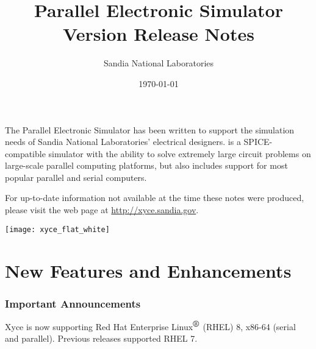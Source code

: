 \documentclass[letterpaper]{scrartcl}
\title{\XyceTitle{} Parallel Electronic Simulator\\
Version \XyceVersionVar{} Release Notes}
\author{ Sandia National Laboratories}
\date{\today}
\begin{document}
\maketitle


The \XyceTM{} Parallel Electronic Simulator has been written to support the
simulation needs of Sandia National Laboratories' electrical designers.
\XyceTM{} is a SPICE-compatible simulator with the ability to solve extremely
large circuit problems on large-scale parallel computing platforms, but also
includes support for most popular parallel and serial computers.

For up-to-date information not available at the time these notes were produced,
please visit the \XyceTM{} web page at
{\color{XyceDeepRed}\url{http://xyce.sandia.gov}}.

\tableofcontents
\vspace*{\fill}
\parbox{\textwidth}
{
  \hfill
  \texttt{[image: xyce\_flat\_white]}
}


\newpage
\section{New Features and Enhancements}

\subsubsection*{Important Announcements}

Xyce is now supporting Red Hat Enterprise Linux${}^{\mbox{\textregistered}}$
(RHEL) 8, x86-64 (serial and parallel). Previous releases supported RHEL 7.

\end{document}
